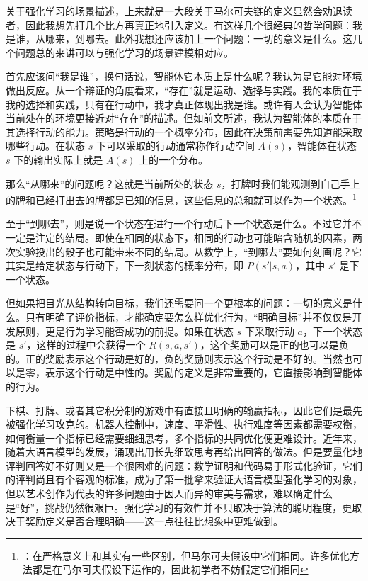关于强化学习的场景描述，上来就是一大段关于马尔可夫链的定义显然会劝退读者，因此我想先打几个比方再真正地引入定义。有这样几个很经典的哲学问题：我是谁，从哪来，到哪去。此外我想还应该加上一个问题：一切的意义是什么。这几个问题总的来讲可以与强化学习的场景建模相对应。

首先应该问“我是谁”，换句话说，智能体它本质上是什么呢？我认为是它能对环境做出反应。从一个辩证的角度看来，“存在”就是运动、选择与实践。我的本质在于我的选择和实践，只有在行动中，我才真正体现出我是谁。或许有人会认为智能体当前处在的环境更接近对“存在”的描述。但如前文所述，我认为智能体的本质在于其选择行动的能力。策略是行动的一个概率分布，因此在决策前需要先知道能采取哪些行动。在状态 $s$ 下可以采取的行动通常称作行动空间 $A(s)$，智能体在状态 $s$ 下的输出实际上就是 $A(s)$ 上的一个分布。

那么“从哪来”的问题呢？这就是当前所处的状态 $s$，打牌时我们能观测到自己手上的牌和已经打出去的牌都是已知的信息，这些信息的总和就可以作为一个状态。\footnote{：在严格意义上和其实有一些区别，但马尔可夫假设中它们相同。许多优化方法都是在马尔可夫假设下运作的，因此初学者不妨假定它们相同}

至于“到哪去”，则是说一个状态在进行一个行动后下一个状态是什么。不过它并不一定是注定的结局。即使在相同的状态下，相同的行动也可能暗含随机的因素，两次实验投出的骰子也可能带来不同的结局。从数学上，“到哪去”要如何刻画呢？它其实是给定状态与行动下，下一刻状态的概率分布，即 $P(s'|s,a)$，其中 $s'$ 是下一个状态。

但如果把目光从结构转向目标，我们还需要问一个更根本的问题：一切的意义是什么。只有明确了评价指标，才能确定要怎么样优化行为，“明确目标”并不仅仅是开发原则，更是行为学习能否成功的前提。如果在状态 $s$ 下采取行动 $a$，下一个状态是 $s'$，这样的过程中会获得一个 $R(s,a,s')$，这个奖励可以是正的也可以是负的。正的奖励表示这个行动是好的，负的奖励则表示这个行动是不好的。当然也可以是零，表示这个行动是中性的。奖励的定义是非常重要的，它直接影响到智能体的行为。

下棋、打牌、或者其它积分制的游戏中有直接且明确的输赢指标，因此它们是最先被强化学习攻克的。机器人控制中，速度、平滑性、执行难度等因素都需要权衡，如何衡量一个指标已经需要细细思考，多个指标的共同优化便更难设计。近年来，随着大语言模型的发展，涌现出用长先细致思考再给出回答的做法。但是要量化地评判回答好不好则又是一个很困难的问题：数学证明和代码易于形式化验证，它们的评判尚且有个客观的标准，成为了第一批拿来验证大语言模型强化学习的对象，但以艺术创作为代表的许多问题由于因人而异的审美与需求，难以确定什么是“好”，挑战仍然很艰巨。强化学习的有效性并不只取决于算法的聪明程度，更取决于奖励定义是否合理明确——这一点往往比想象中更难做到。

